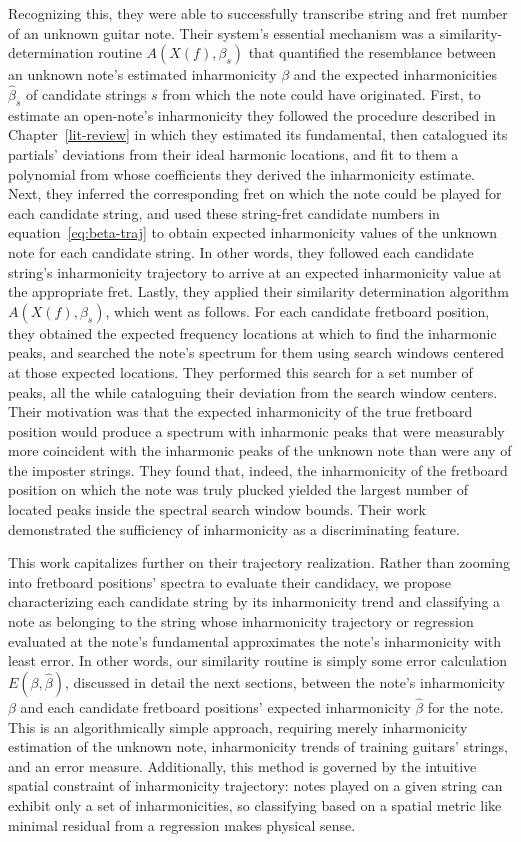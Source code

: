 \documentclass[12pt]{cmuthesis}
\begin{document}
Recognizing this, they were able to successfully transcribe string and fret number of an unknown guitar note. Their system's essential mechanism was a similarity-determination routine $A(X(f),\beta_s)$ that quantified the resemblance between an unknown note's estimated inharmonicity $\beta$ and the expected inharmonicities $\hat\beta_s$ of candidate strings $s$ from which the note could have originated. First, to estimate an open-note's inharmonicity they followed the procedure described in Chapter~\ref{lit-review} in which they estimated its fundamental, then catalogued its partials' deviations from their ideal harmonic locations, and fit to them a polynomial from whose coefficients they derived the inharmonicity estimate. Next, they inferred the corresponding fret on which the note could be played for each candidate string, and used these string-fret candidate numbers in equation~\eqref{eq:beta-traj} to obtain expected inharmonicity values of the unknown note for each candidate string. In other words, they followed each candidate string's inharmonicity trajectory to arrive at an expected inharmonicity value at the appropriate fret. Lastly, they applied their similarity determination algorithm $A(X(f),\beta_s)$, which went as follows. For each candidate fretboard position, they obtained the expected frequency locations at which to find the inharmonic peaks, and searched the note's spectrum for them using search windows centered at those expected locations. They performed this search for a set number of peaks, all the while cataloguing their deviation from the search window centers. Their motivation was that the expected inharmonicity of the true fretboard position would produce a spectrum with inharmonic peaks that were measurably more coincident with the inharmonic peaks of the unknown note than were any of the imposter strings. They found that, indeed, the inharmonicity of the fretboard position on which the note was truly plucked yielded the largest number of located peaks inside the spectral search window bounds. Their work demonstrated the sufficiency of inharmonicity as a discriminating feature.

This work capitalizes further on their trajectory realization. Rather than zooming into fretboard positions' spectra to evaluate their candidacy, we propose characterizing each candidate string by its inharmonicity trend and classifying a note as belonging to the string whose inharmonicity trajectory or regression evaluated at the note's fundamental approximates the note's inharmonicity with least error. In other words, our similarity routine is simply some error calculation $E(\beta,\hat{\beta})$, discussed in detail the next sections, between the note's inharmonicity $\beta$ and each candidate fretboard positions' expected inharmonicity $\hat{\beta}$ for the note. This is an algorithmically simple approach, requiring merely inharmonicity estimation of the unknown note, inharmonicity trends of training guitars' strings, and an error measure. Additionally, this method is governed by the intuitive spatial constraint of inharmonicity trajectory: notes played on a given string can exhibit only a set of inharmonicities, so classifying based on a spatial metric like minimal residual from a regression makes physical sense.
\end{document}
